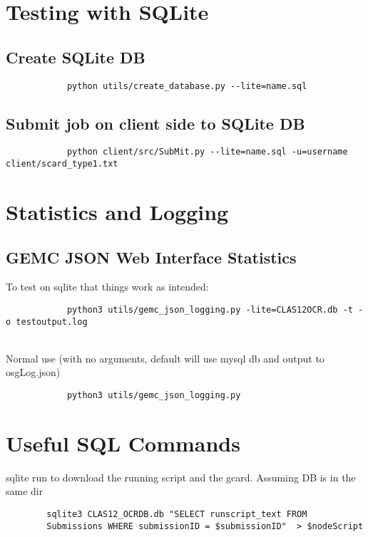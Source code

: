 \section{Testing with SQLite}
    \subsection*{Create SQLite DB}
        \begin{lstlisting}
            python utils/create_database.py --lite=name.sql
        \end{lstlisting}
    
    \subsection*{Submit job on client side to SQLite DB}
        \begin{lstlisting}
            python client/src/SubMit.py --lite=name.sql -u=username client/scard_type1.txt
        \end{lstlisting}
    
\section{Statistics and Logging}
    \subsection*{GEMC JSON Web Interface Statistics}
         To test on sqlite that things work as intended: 
         \begin{lstlisting}
            python3 utils/gemc_json_logging.py -lite=CLAS12OCR.db -t -o testoutput.log
        \end{lstlisting}
        ~\\
        \newline
        Normal use (with no arguments, default will use mysql db and output to osgLog.json)
        \begin{lstlisting}
            python3 utils/gemc_json_logging.py 
        \end{lstlisting}
   
   
\iffalse     
\section{Useful SQL Commands}
     sqlite run to download the running script and the gcard. Assuming DB is in the same dir
    \begin{lstlisting}
        sqlite3 CLAS12_OCRDB.db "SELECT runscript_text FROM
        Submissions WHERE submissionID = $submissionID"  > $nodeScript
    \end{lstlisting}
    
